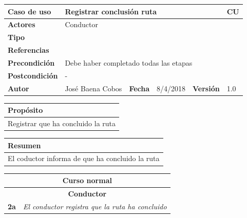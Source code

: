 \documentclass[12pt,spanish]{article}
\begin{document}
\begin{table}[H]
	\centering
	\begin{tabular}{|m{3cm}|m{4cm}|m{2cm}|m{2cm}|m{2cm}|m{1cm}|}
		\hline
		\textbf{Caso de uso} &  \multicolumn{4}{m{11cm}|}{Registrar conclusión ruta} \vline &  \cellcolor{gray!40}CU\arabic{contadorCU}  \stepcounter{contadorCU} \\
		\hline
		\textbf{Actores} & \multicolumn{5}{m{11cm}|}{Conductor} \\
		\hline
		\textbf{Tipo} & \multicolumn{5}{m{11cm}|}{} \\
		\hline
		\textbf{Referencias} &\multicolumn{5}{m{11cm}|}{} \\
		\hline
		\textbf{Precondición} & \multicolumn{5}{m{11cm}|}{Debe haber completado todas las etapas} \\
		\hline
		\textbf{Postcondición} & \multicolumn{5}{m{11cm}|}{-} \\
		\hline
		\textbf{Autor} & José Baena Cobos & \textbf{Fecha} & 8/4/2018 & \textbf{Versión} & 1.0 \\
		\hline
	\end{tabular}
	
	\vspace{1cm}
	
	\begin{tabular}{|m{16.2cm}|}
		\hline
		\textbf{Propósito} \\
		\hline
		Registrar que ha concluido la ruta\\
		\hline
	\end{tabular}
	
	\vspace{1cm}
	
	\begin{tabular}{|m{16.2cm}|}
		\hline
		\textbf{Resumen} \\
		\hline
		El coductor informa de que ha concluido la ruta\\
		\hline
	\end{tabular}
	
	\vspace{1cm}
	
	\begin{tabular}{|m{12pt}|m{19.66cm}|}
		\hline
		\multicolumn{2}{|c|}{\textbf{Curso normal}} \\
		\hline
		\multicolumn{2}{|c|}{\textbf{Conductor}} \\
		\hline
		\textbf{2a} & \textit{El conductor registra que la ruta ha concluido} \\
		\hline
	

\end{tabular}
\end{table}
\end{document}
